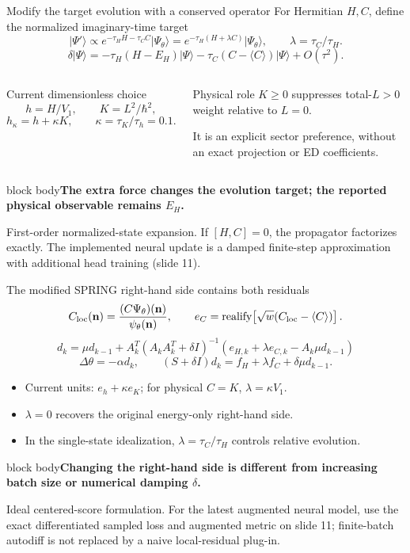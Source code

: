 \documentclass[aspectratio=169,10pt]{beamer}
\newcommand{\src}[1]{\vfill{\fontsize{6.3}{7.5}\selectfont\color{muted}#1\par}}
\newcommand{\take}[1]{\vspace{1mm}\begin{beamercolorbox}[sep=1.6mm,wd=\textwidth]{block body}\small\color{teal}\textbf{#1}\end{beamercolorbox}}
\newcommand{\ket}[1]{\lvert #1\rangle}
\newcommand{\nn}{\mathbf n}
\begin{document}
\begin{frame}{Modify the target evolution with a conserved operator}
\small For Hermitian $H,C$, define the normalized imaginary-time target
\[
\ket{\Psi'}\propto e^{-\tau_H H-\tau_C C}\ket{\Psi_\theta}
=e^{-\tau_H(H+\lambda C)}\ket{\Psi_\theta},
\qquad \lambda=\tau_C/\tau_H .
\]
\[
\delta\ket{\Psi}
=-\tau_H(H-E_H)\ket{\Psi}
-\tau_C(C-\langle C\rangle)\ket{\Psi}
+O(\tau^2).
\]
\begin{columns}[T,onlytextwidth]
\begin{block}{Current dimensionless choice}
\[
h=H/V_1,\qquad K=L^2/\hbar^2,
\]
\[
h_\kappa=h+\kappa K,\qquad
\kappa=\tau_K/\tau_h=0.1.
\]
\end{block}
\begin{block}{Physical role}
\small $K\geq0$ suppresses total-$L>0$ weight relative to $L=0$.\par\medskip
It is an explicit sector preference, without an exact projection or ED coefficients.
\end{block}
\end{columns}
\take{The extra force changes the evolution target; the reported physical observable remains $E_H$.}
\src{First-order normalized-state expansion. If $[H,C]=0$, the propagator factorizes exactly. The implemented neural update is a damped finite-step approximation with additional head training (slide 11).}
\end{frame}

\begin{frame}{The modified SPRING right-hand side contains both residuals}
\[
C_{\rm loc}(\nn)=\frac{(C\Psi_\theta)(\nn)}{\psi_\theta(\nn)},\qquad
e_C=\operatorname{realify}\!\left[\sqrt w(C_{\rm loc}-\langle C\rangle)\right].
\]
\[
\boxed{
d_k=\mu d_{k-1}+A_k^T(A_kA_k^T+\delta I)^{-1}
\left(e_{H,k}+\lambda e_{C,k}-A_k\mu d_{k-1}\right)}
\]
\[
\Delta\theta=-\alpha d_k,\qquad
(S+\delta I)d_k=f_H+\lambda f_C+\delta\mu d_{k-1}.
\]
\begin{itemize}\setlength\itemsep{6pt}
\item Current units: $e_h+\kappa e_K$; for physical $C=K$, $\lambda=\kappa V_1$.
\item $\lambda=0$ recovers the original energy-only right-hand side.
\item In the single-state idealization, $\lambda=\tau_C/\tau_H$ controls relative evolution.
\end{itemize}
\take{Changing the right-hand side is different from increasing batch size or numerical damping $\delta$.}
\src{Ideal centered-score formulation. For the latest augmented neural model, use the exact differentiated sampled loss and augmented metric on slide 11; finite-batch autodiff is not replaced by a naive local-residual plug-in.}
\end{frame}
\end{document}
